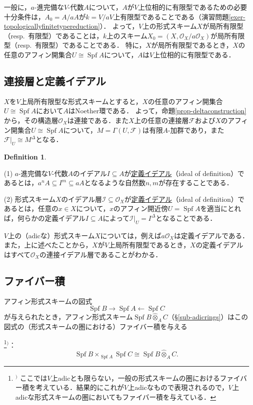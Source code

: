 \documentclass[a4paper,12pt, dvipdfmx]{jsbook}
\def\O{\mathscr{O}}
\def\Spf{\mathop{\mathrm{Spf}}\nolimits}
\theoremstyle{plain}
\theoremstyle{definition}
\newtheorem{dfn}[thm]{\bfseries Definition}
\newcounter{chushaku}
\def\chu#1{\addtocounter{chushaku}{1}\footnote[\value{chushaku}]{${}^)$ #1}${}^)$}
\begin{document}
一般に，$a$-進完備な$V$-代数$A$について，$A$が$V$上位相的に有限型であるための必要十分条件は，$A_0=A/aA$が$k=V/aV$上有限型であることである（演習問題\ref{exer-topologicallyfinitetypereduction}）．
よって，$V$上の形式スキーム$X$が局所有限型（resp.\ 有限型）であることは，$k$上のスキーム$X_0=(X,\O_X/a\O_X)$が局所有限型（resp.\ 有限型）であることである．
特に，$X$が局所有限型であるとき，$X$の任意のアフィン開集合$U\cong\Spf A$について，$A$は$V$上位相的に有限型である．

\subsection{連接層と定義イデアル}\label{sub-idealofdefinition}
$X$を$V$上局所有限型な形式スキームとすると，$X$の任意のアフィン開集合$U\cong\Spf A$において$A$はNoether環である．
よって，命題\ref{prop-deltaconstruction}から，その構造層$\O_X$は連接である．また$X$上の任意の連接層$\mathscr{F}$および$X$のアフィン開集合$U\cong\Spf A$について，$M=\Gamma(U,\mathscr{F})$は有限$A$-加群であり，また$\mathscr{F}|_U\cong M^{\Delta}$となる．

\begin{dfn}\label{dfn-idealofdefinition}{\rm 
(1) $a$-進完備な$V$-代数$A$のイデアル$I\subseteq A$が\underline{定義イデアル}（ideal of definition）であるとは，$a^nA\subseteq I^m\subseteq aA$となるような自然数$n,m$が存在することである．

(2) 形式スキーム$X$のイデアル層$\mathscr{I}\subseteq\O_X$が\underline{定義イデアル}（ideal of definition）であるとは，任意の$x\in X$について，$x$のアフィン開近傍$U=\Spf A$を適当にとれば，何らかの定義イデアル$I\subseteq A$によって$\mathscr{I}|_U=I^{\Delta}$となることである．}
\end{dfn}

$V$上の（adicな）形式スキーム$X$については，例えば$a\O_X$は定義イデアルである．
また，上に述べたことから，$X$が$V$上局所有限型であるとき，$X$の定義イデアルはすべて$\O_X$の連接イデアル層であることがわかる．

\subsection{ファイバー積}\label{sub-fiberproducts}
アフィン形式スキームの図式
$$
\Spf B\longrightarrow\Spf A\longleftarrow\Spf C
$$
が与えられたとき，アフィン形式スキーム$\Spf B\widehat{\otimes}_AC$（\S\ref{sub-adicrings}）はこの図式の（形式スキームの圏における）ファイバー積を与える\chu{ここでは$V$上adicとも限らない，一般の形式スキームの圏におけるファイバー積を考えている．結果的にこれが$V$上adicなもので表現されるので，$V$上adicな形式スキームの圏においてもファイバー積を与えている．}：
$$
\Spf B\times_{\Spf A}\Spf C\cong\Spf B\widehat{\otimes}_AC.
$$
\end{document}
